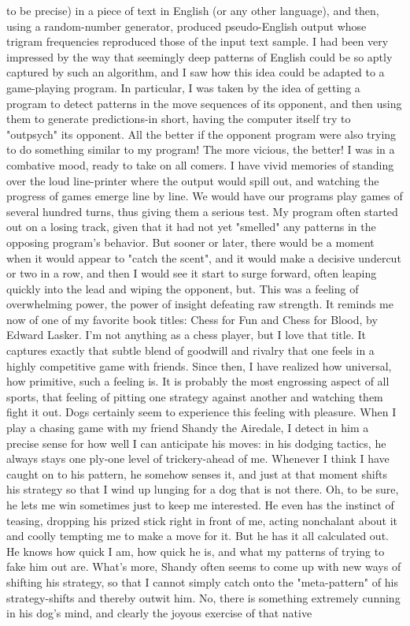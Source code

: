 to be precise) in a piece of text in English (or any other language), and then, using a
random-number generator, produced pseudo-English output whose trigram
frequencies reproduced those of the input text sample. I had been very impressed by
the way that seemingly deep patterns of English could be so aptly captured by such an
algorithm, and I saw how this idea could be adapted to a game-playing program. In
particular, I was taken by the idea of getting a program to detect patterns in the move
sequences of its opponent, and then using them to generate predictions-in short,
having the computer itself try to "outpsych" its opponent. All the better if the
opponent program were also trying to do something similar to my program! The more
vicious, the better! I was in a combative mood, ready to take on all comers.
        I have vivid memories of standing over the loud line-printer where the output
would spill out, and watching the progress of games emerge line by line. We would
have our programs play games of several hundred turns, thus giving them a serious
test. My program often started out on a losing track, given that it had not yet
"smelled" any patterns in the opposing program's behavior. But sooner or later, there
would be a moment when it would appear to "catch the scent", and it would make a
decisive undercut or two in a row, and then I would see it start to surge forward, often
leaping quickly into the lead and wiping the opponent, but. This was a feeling of
overwhelming power, the power of insight defeating raw strength. It reminds me now
of one of my favorite book titles: Chess for Fun and Chess for Blood, by Edward
Lasker. I'm not anything as a chess player, but I love that title. It captures exactly that
subtle blend of goodwill and rivalry that one feels in a highly competitive game with
friends.
        Since then, I have realized how universal, how primitive, such a feeling is. It is
probably the most engrossing aspect of all sports, that feeling of pitting one strategy
against another and watching them fight it out. Dogs certainly seem to experience this
feeling with pleasure. When I play a chasing game with my friend Shandy the
Airedale, I detect in him a precise sense for how well I can anticipate his moves: in
his dodging tactics, he always stays one ply-one level of trickery-ahead of me.
Whenever I think I have caught on to his pattern, he somehow senses it, and just at
that moment shifts his strategy so that I wind up lunging for a dog that is not there.
        Oh, to be sure, he lets me win sometimes just to keep me interested. He even
has the instinct of teasing, dropping his prized stick right in front of me, acting
nonchalant about it and coolly tempting me to make a move for it. But he has it all
calculated out. He knows how quick I am, how quick he is, and what my patterns of
trying to fake him out are.
        What's more, Shandy often seems to come up with new ways of shifting his
strategy, so that I cannot simply catch onto the "meta-pattern" of his strategy-shifts
and thereby outwit him. No, there is something extremely cunning in his dog's mind,
and clearly the joyous exercise of that native




